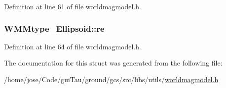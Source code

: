 Definition at line 61 of file worldmagmodel.\-h.

\hypertarget{struct_w_m_mtype___ellipsoid_aa051b086d02950addfe843925a79b3f9}{
\subsubsection[{re}]{ W\-M\-Mtype\-\_\-\-Ellipsoid\-::re}}\label{struct_w_m_mtype___ellipsoid_aa051b086d02950addfe843925a79b3f9}


Definition at line 64 of file worldmagmodel.\-h.



The documentation for this struct was generated from the following file\-:\begin{DoxyCompactItemize}
\item 
/home/jose/\-Code/gui\-Tau/ground/gcs/src/libs/utils/\hyperlink{worldmagmodel_8h}{worldmagmodel.\-h}\end{DoxyCompactItemize}
